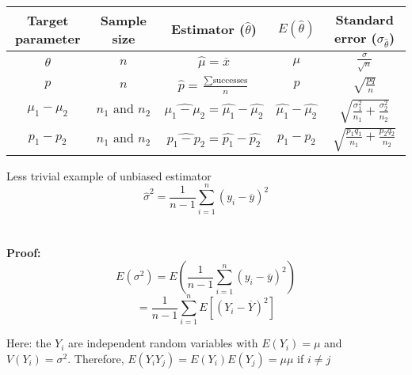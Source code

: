 \documentclass[12pt, letterpaper]{article}
\begin{document}
\begin{center}
\begin{tabular}{|c |c |c |c |c |}
    \hline
    Target parameter & Sample size & Estimator ($\hat{\theta}$) & $E(\hat{\theta})$ & Standard error ($\sigma_{\hat{\theta}}$) \\ 
    \hline
    $\theta$ & $n$ & $\hat{\mu}=\overline{x}$ & $\mu$ &$\frac{\sigma}{\sqrt{n}}$ \\  
    \hline
    $p$ & $n$ & $\hat{p}=\frac{\sum \text{successes}}{n} $ & $p$ & $\sqrt{\frac{pq}{n}}$ \\
    \hline
    $\mu_1-\mu_2$ & $n_1 \text{ and }n_2$ & $\widehat{\mu_1 -\mu_2}=\hat{\mu_1}-\hat{\mu_2}$ & $\hat{\mu_1}-\hat{\mu_2}$ & $\sqrt{\frac{\sigma_1^2}{n_1} + \frac{\sigma_2^2}{n_2}}$ \\
    \hline
    $p_1-p_2$ & $n_1 \text{ and }n_2$ & $\widehat{p_1-p_2}=\hat{p_1}-\hat{p_2}$ & $p_1-p_2$ & $\sqrt{\frac{p_1q_1}{n_1}+\frac{p_2q_2}{n_2}}$ \\
    \hline
\end{tabular}
\end{center}

Less trivial example of unbiased estimator
$$\hat{\sigma}^2 = \frac{1}{n-1}\sum_{i=1}^{n} (y_i-\overline{y})^2  $$ \\\\

\textbf{Proof:}
$$E(\sigma^2) = E(\frac{1}{n-1}\sum_{i=1}^{n} (y_i-\overline{y})^2)$$
$$=\frac{1}{n-1}\sum_ {i=1}^{n} E[(Y_i-\overline{Y})^2]$$

Here: the $Y_i$ are independent random variables with $E(Y_i)=\mu$ and $V(Y_i)=\sigma^2$. Therefore, $E(Y_iY_j)=E(Y_i)E(Y_j) = \mu\mu$ if $i \neq j$
\end{document}
